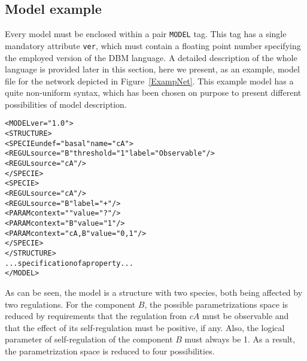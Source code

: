 \documentclass[12pt]{article}
\begin{document}
\subsection{Model example}
Every model must be enclosed within a pair \texttt{MODEL} tag. This tag has a single mandatory attribute \texttt{ver}, which must contain a floating point number specifying the employed version of the DBM language. A detailed description of the whole language is provided later in this section, here we present, as an example, model file for the network depicted in Figure~\ref{ExampNet}. This example model has a quite non-uniform syntax, which has been chosen on purpose to present different possibilities of model description.
\begin{alltt}
<MODEL ver="1.0">
    <STRUCTURE>
        <SPECIE undef="basal" name="cA">
            <REGUL source="B" threshold ="1" label="Observable"/>
            <REGUL source="cA" />            
        </SPECIE>
        <SPECIE>
            <REGUL source="cA" />
            <REGUL source="B" label="+" />            
            <PARAM context="" value="?" />
            <PARAM context="B" value="1" />
            <PARAM context="cA,B" value="0,1" />          
        </SPECIE>
    </STRUCTURE>
    ... specification of a property ...
</MODEL>
\end{alltt}
As can be seen, the model is a structure with two species, both being affected by two regulations. For the component $B$, the possible parametrizations space is reduced by requirements that the regulation from $cA$ must be observable and that the effect of its self-regulation must be positive, if any. Also, the logical parameter of self-regulation of the component $B$ must always be 1. As a result, the parametrization space is reduced to four possibilities.
\end{document}
